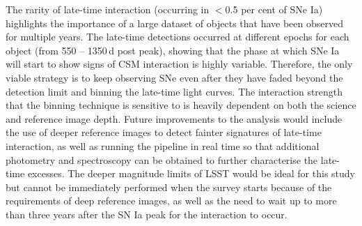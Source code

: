 \documentclass[a4paper,oneside,12pt, class=Latex/Classes/PhDthesisPSnPDF, crop=false]{standalone}
\begin{document}
The rarity of late-time interaction (occurring in $<$0.5 per cent of SNe Ia) highlights the importance of a large dataset of objects that have been observed for multiple years. The late-time detections occurred at different epochs for each object (from 550 -- 1350\,d post peak), showing that the phase at which SNe Ia will start to show signs of CSM interaction is highly variable. Therefore, the only viable strategy is to keep observing SNe even after they have faded beyond the detection limit and binning the late-time light curves. The interaction strength that the binning technique is sensitive to is heavily dependent on both the science and reference image depth. Future improvements to the analysis would include the use of deeper reference images to detect fainter signatures of late-time interaction, as well as running the pipeline in real time so that additional photometry and spectroscopy can be obtained to further characterise the late-time excesses. The deeper magnitude limits of LSST would be ideal for this study but cannot be immediately performed when the survey starts because of the requirements of deep reference images, as well as the need to wait up to more than three years after the SN Ia peak for the interaction to occur. 
\end{document}
